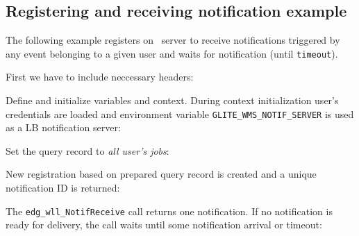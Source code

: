 \subsection{Registering and receiving notification example}

The following example registers on \LB\ server to receive
notifications triggered by any event belonging to a
given user and waits for notification (until \verb'timeout').


First we have to include neccessary headers:


Define and initialize variables and context. During context
initialization user's credentials are loaded and environment variable
\verb'GLITE_WMS_NOTIF_SERVER' is used as a LB notification server:
 


Set the query record to \emph{all user's jobs}:


New registration based on prepared query record is created and a
unique notification ID is returned: 


The \verb'edg_wll_NotifReceive' call returns one notification. If no notification is 
ready for delivery, the call waits until some notification arrival or timeout:



